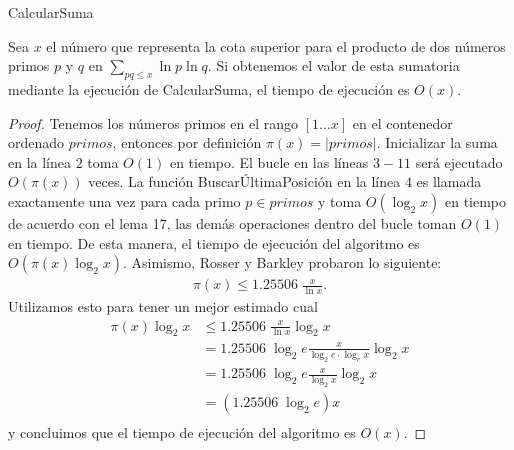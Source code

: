 \begin{algorithm}[H]
\SetAlgoLined
\DontPrintSemicolon
{}
\caption{CalcularSuma\label{CS}}
\end{algorithm}

\begin{lemma}
Sea $x$ el n\'umero que representa la cota superior para el producto de dos n\'umeros primos
$p$ y $q$ en $\sum_{pq \leq x} \ln p \ln q$.
Si obtenemos el valor de esta sumatoria mediante la ejecuci\'on de CalcularSuma, 
el tiempo de ejecuci\'on es $O(x)$.
\end{lemma}

\begin{proof}
Tenemos los n\'umeros primos en el rango $[1 \dots x]$ en el contenedor ordenado $primos$,
entonces por definici\'on $\pi(x)=|primos| $.
Inicializar la suma en la l\'inea $2$ toma $O(1)$ en tiempo.
El bucle en las l\'ineas $3-11$ ser\'a ejecutado $O(\pi(x))$ veces.
La funci\'on Buscar\'UltimaPosici\'on en la l\'inea $4$ es llamada exactamente una vez para cada primo $p \in primos$ y
toma $O(\log_2 x)$ en tiempo de acuerdo con el lema 17, 
las dem\'as operaciones dentro del bucle toman $O(1)$ en tiempo.
De esta manera, el tiempo de ejecuci\'on del algoritmo es $O(\pi(x)\log_2 x)$.
Asimismo, Rosser y Barkley \cite[teorema 2 y corolario 1]{Chebyshev} probaron lo siguiente:
\begin{align}
\pi(x) \leq 1.25506\;\frac{x}{\ln x}. %
\end{align}
Utilizamos esto para tener un mejor estimado cual 
\begin{align}
    \pi(x)\log_2 x &\leq 1.25506\;\frac{x}{\ln x} \log_2 x\\
    &= 1.25506\;\log_2 e \frac{x}{\log_2 e \cdot \log_e x} \log_2 x\\
    &= 1.25506\;\log_2 e \frac{x}{\log_2 x} \log_2 x\\
    &= (1.25506\;\log_2 e) x\\
\end{align}
y concluimos que el tiempo de ejecuci\'on del algoritmo es $O(x)$.
\end{proof}

